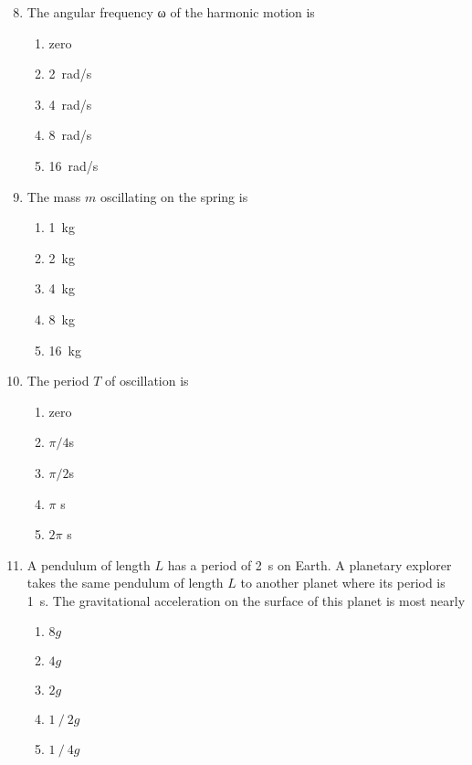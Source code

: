 \documentclass[12pt]{article}
\begin{document}
\begin{enumerate}[leftmargin=50pt,label=\underline{\hspace{0.4in}} \arabic*.]
  \setcounter{enumi}{7}
\item The angular frequency ω of the harmonic motion is
  \begin{enumerate}[noitemsep,topsep=0pt]
  \item zero
  \item\SI{2}{rad/s}
  \item\SI{4}{rad/s}
  \item\SI{8}{rad/s}
  \item\SI{16}{rad/s}
  \end{enumerate}
  
\item The mass $m$ oscillating on the spring is
  \begin{enumerate}[noitemsep,topsep=0pt]
  \item\SI{1}{\kg}
  \item\SI{2}{\kg}
  \item\SI{4}{\kg}
  \item\SI{8}{\kg}
  \item\SI{16}{\kg}
  \end{enumerate}
  
\item The period $T$ of oscillation is
  \begin{enumerate}[noitemsep,topsep=0pt]
  \item zero
  \item $\pi/4$\si{s}
  \item $\pi/2$\si{s}
  \item $\pi$  \si{s}
  \item $2\pi$ \si{s}
  \end{enumerate}

\item A pendulum of length $L$ has a period of \SI{2}{\s} on Earth. A planetary
  explorer takes the same pendulum of length $L$ to another planet where
  its period is \SI{1}{\s}. The gravitational acceleration on the surface of
  this planet is most nearly
  \begin{enumerate}[noitemsep,topsep=0pt]
  \item $8 g$
  \item $4 g$
  \item $2 g$
  \item $1⁄2 g$
  \item $1⁄4 g$
  \end{enumerate}


\end{enumerate}
\end{document}
